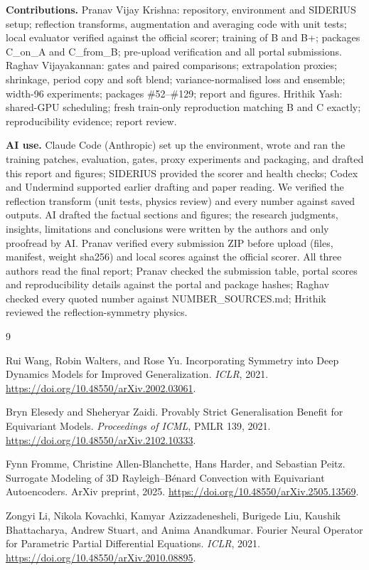 \documentclass{article}
\begin{document}
\textbf{Contributions.} Pranav Vijay Krishna: repository, environment and SIDERIUS
setup; reflection transforms, augmentation and averaging code with unit tests; local
evaluator verified against the official scorer; training of B and B+; packages
C\_on\_A and C\_from\_B; pre-upload verification and all portal submissions. Raghav
Vijayakannan: gates and paired comparisons; extrapolation proxies; shrinkage, period
copy and soft blend; variance-normalised loss and ensemble; width-96 experiments;
packages \#52--\#129; report and figures. Hrithik Yash: shared-GPU scheduling; fresh
train-only reproduction matching B and C exactly; reproducibility evidence; report
review.

\textbf{AI use.} Claude Code (Anthropic) set up the environment, wrote and ran the
training patches, evaluation, gates, proxy experiments and packaging, and drafted
this report and figures; SIDERIUS provided the scorer and health checks; Codex and
Undermind supported earlier drafting and paper reading. We verified the reflection
transform (unit tests, physics review) and every number against saved outputs. AI drafted the factual sections and
figures; the research judgments, insights, limitations and conclusions were written
by the authors and only proofread by AI. Pranav verified every submission ZIP before
upload (files, manifest, weight sha256) and local scores against the official
scorer. All three authors read the final report; Pranav checked the submission table,
portal scores and reproducibility details against the portal and package hashes;
Raghav checked every quoted number against NUMBER\_SOURCES.md; Hrithik reviewed the
reflection-symmetry physics.

\clearpage
\begin{thebibliography}{9}

Rui Wang, Robin Walters, and Rose Yu.
Incorporating Symmetry into Deep Dynamics Models for Improved Generalization.
\emph{ICLR}, 2021.
\url{https://doi.org/10.48550/arXiv.2002.03061}.

Bryn Elesedy and Sheheryar Zaidi.
Provably Strict Generalisation Benefit for Equivariant Models.
\emph{Proceedings of ICML}, PMLR 139, 2021.
\url{https://doi.org/10.48550/arXiv.2102.10333}.

Fynn Fromme, Christine Allen-Blanchette, Hans Harder, and Sebastian Peitz.
Surrogate Modeling of 3D Rayleigh--B\'enard Convection with Equivariant
Autoencoders. ArXiv preprint, 2025.
\url{https://doi.org/10.48550/arXiv.2505.13569}.

Zongyi Li, Nikola Kovachki, Kamyar Azizzadenesheli, Burigede Liu, Kaushik
Bhattacharya, Andrew Stuart, and Anima Anandkumar.
Fourier Neural Operator for Parametric Partial Differential Equations.
\emph{ICLR}, 2021.
\url{https://doi.org/10.48550/arXiv.2010.08895}.

\end{thebibliography}
\end{document}
